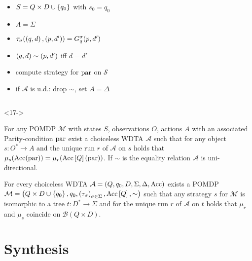 \documentclass{beamer}
\begin{document}
\begin{frame}
\begin{onlyenv}
\begin{overlayarea}{\textwidth}{0.8\textheight}
\begin{columns}
\begin{column}{0.65\textwidth}
\begin{onlyenv}
\begin{itemize}
                \item<11-> $S = Q\times D\cup\left\{q_{0}\right\}$ with
                  $s_{0} = q_{0}$
                \item<12-> $A = \Sigma$
                \item<13-> $\tau_{\sigma}(\left(q, d\right), \left(p, d'\right)) = 
                  G_{q}^{\sigma}(p, d')$
                \item<14-> $\left(q, d\right)\sim\left(p, d'\right)$ iff $d = d'$
                \item<15-> compute strategy for $\operatorname{par}$ on $\mathcal{S}$
                \item<16-> if $\mathcal{A}$ is u.d.: drop $\sim$, set 
                  $A = \Delta$
              \end{itemize}
            \end{onlyenv}
          \end{column}
        \end{columns}
    \end{overlayarea}
    \end{onlyenv}
    \begin{onlyenv}<17->
      \begin{theorem}
        For any \ac{POMDP} $\mathcal{M}$ with states $S$, observations $O$, actions
        $A$ with an associated Parity-condition $\operatorname{par}$ exist a choiceless
        \ac{WDTA} $\mathcal{A}$ such that for any object $s:O^{*}\rightarrow A$ and
        the unique run $r$ of $\mathcal{A}$ on $s$ holds that
        $\mu_{s}(\operatorname{Acc}(\operatorname{par})) = \mu_{r}(\operatorname{Acc}\left[Q\right](\operatorname{par}))$. If $\sim$ is
        the equality relation $\mathcal{A}$ is uni-directional.
      \end{theorem}
      \begin{theorem}
        For every choiceless \ac{WDTA} 
        $\mathcal{A} = \left(Q, q_{0}, D, \Sigma, \Delta, \operatorname{Acc}\right)$ exists a \ac{POMDP}
        $\mathcal{M} = \left(Q\times D\cup\left\{q_{0}\right\}, q_{0}, 
        \left(\tau_{\sigma}\right)_{\sigma\in\Sigma}, \operatorname{Acc}\left[Q\right], \sim\right)$ such that
        any strategy $s$ for $\mathcal{M}$ is isomorphic to a tree
        $t:D^{*}\rightarrow\Sigma$ and for the unique run $r$ of $\mathcal{A}$ on $t$
        holds that $\mu_{r}$ and $\mu_{s}$ coincide on $\mathcal{B}(Q\times D)$.
      \end{theorem}
    \end{onlyenv}
  \end{frame}

  \section{Synthesis}
  \begin{frame}
  \end{frame}
\end{document}

